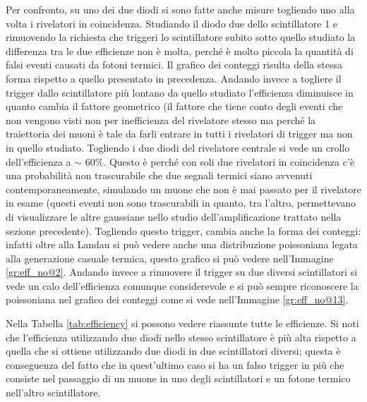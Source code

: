 Per confronto, su uno dei due diodi si sono fatte anche misure togliendo uno alla volta i rivelatori in coincidenza. Studiando il diodo due dello scintillatore 1 e rimuovendo la richiesta che triggeri lo scintillatore subito sotto quello studiato la differenza tra le due efficienze non è molta, perché è molto piccola la quantità di falsi eventi causati da fotoni termici. Il grafico dei conteggi risulta della stessa forma rispetto a quello presentato in precedenza. Andando invece a togliere il trigger dallo scintillatore più lontano da quello studiato l'efficienza diminuisce in quanto cambia il fattore geometrico (il fattore che tiene conto degli eventi che non vengono visti non per inefficienza del rivelatore stesso ma perché la traiettoria dei muoni è tale da farli entrare in tutti i rivelatori di trigger ma non in quello studiato. Togliendo i due diodi del rivelatore centrale si vede un crollo dell'efficienza a $\sim$ 60\%. Questo \`e perch\'e con soli due rivelatori in coincidenza c'\`e una probabilit\`a non trascurabile che due segnali termici siano avvenuti contemporaneamente, simulando un muone che non \`e mai passato per il rivelatore in esame (questi eventi non sono trascurabili in quanto, tra l'altro, permettevano di visualizzare le altre gaussiane nello studio dell'amplificazione trattato nella sezione precedente). Togliendo questo trigger, cambia anche la forma dei conteggi: infatti oltre alla Landau si può vedere anche una distribuzione poissoniana legata alla generazione casuale termica, questo grafico si può vedere nell'Immagine \ref{gr:eff_no@2}. Andando invece a rimuovere il trigger su due diversi scintillatori si vede un calo dell'efficienza comunque considerevole e si può sempre riconoscere la poissoniana nel grafico dei conteggi come si vede nell'Immagine \ref{gr:eff_no@13}.\\

Nella Tabella \ref{tab:efficiency} si possono vedere riassunte tutte le efficienze. Si noti che l'efficienza utilizzando due diodi nello stesso scintillatore è più alta rispetto a quella che si ottiene utilizzando due diodi in due scintillatori diversi; questa è conseguenza del fatto che in quest'ultimo caso si ha un falso trigger in più che consiste nel passaggio di un muone in uno degli scintillatori e un fotone termico nell'altro scintillatore.

